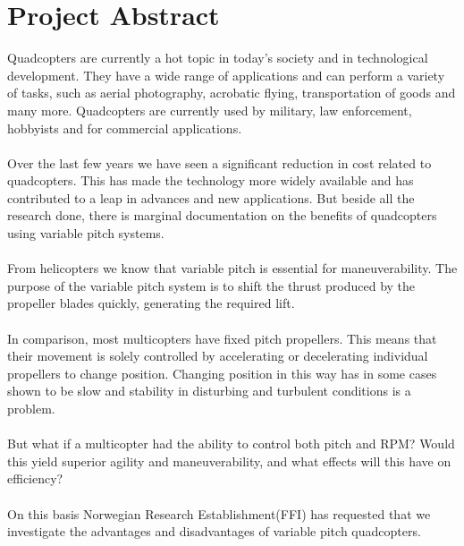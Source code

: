 \section*{Project Abstract}

Quadcopters are currently a hot topic in today’s society and in technological development. They have a wide range of applications and can perform a variety of tasks, such as aerial photography, acrobatic flying, transportation of goods and many more. Quadcopters are currently used by military, law enforcement, hobbyists and for commercial applications. 
\\\\
Over the last few years we have seen a significant reduction in cost related to quadcopters. This has made the technology more widely available and has contributed to a leap in 
advances and new applications. But beside all the research done, there is marginal documentation on the benefits of quadcopters using variable pitch systems.
\\\\
From helicopters we know that variable pitch is essential for maneuverability. The purpose of the variable pitch system is to shift the thrust produced by the propeller blades quickly, generating the required lift. 
\\\\
In comparison, most multicopters have fixed pitch propellers. This means that their movement is solely controlled by accelerating or decelerating individual propellers to change position. Changing position in this way has in some cases shown to be slow and stability in disturbing and turbulent conditions is a problem. 
\\\\
But what if a multicopter had the ability to control both pitch and RPM? Would this yield superior agility and maneuverability, and what effects will this have on efficiency? 
\\\\
On this basis Norwegian Research Establishment(FFI) has requested that we investigate the advantages and disadvantages of variable pitch quadcopters. 
